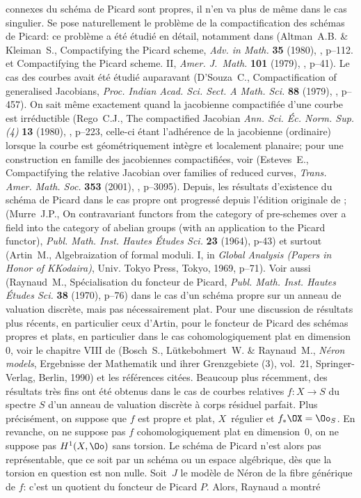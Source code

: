 \begin{remarques}
connexes du sch\'ema de Picard sont propres, il n'en va plus de m\^eme dans le cas singulier. Se pose naturellement le probl\`eme de la compactification des sch\'emas de Picard: ce probl\`eme a \'et\'e \'etudi\'e en d\'etail, notamment dans (Altman~A.B. \& Kleiman~S., {\og Compactifying the Picard scheme\fg}, \emph{Adv. in Math.} \textbf{35} (1980), , p--112. et {\og Compactifying the Picard scheme. II\fg}, \emph{Amer. J.~Math.} \textbf{101} (1979), , p--41). Le cas des courbes avait \'et\'e \'etudi\'e auparavant (D'Souza~C., {\og Compactification of generalised Jacobians\fg}, \emph{Proc. Indian Acad. Sci. Sect. A Math. Sci.} \textbf{88} (1979), , p--457). On sait m\^eme exactement quand la jacobienne compactifi\'ee d'une courbe est irr\'eductible (Rego~C.J., {\og The compactified Jacobian\fg} \emph{Ann. Sci. \'Ec. Norm. Sup. (4)} \textbf{13} (1980), , p--223, celle-ci \'etant l'adh\'erence de la jacobienne (ordinaire) lorsque la courbe est g\'eom\'etriquement int\`egre et localement planaire; pour une construction en famille des jacobiennes compactifi\'ees, voir (Esteves~E., {\og Compactifying the relative Jacobian over families of reduced curves\fg}, \emph{Trans. Amer. Math. Soc.} \textbf{353} (2001), , p--3095). Depuis, les r\'esultats d'existence du sch\'ema de Picard dans le cas propre ont progress\'e depuis l'\'edition originale de ; \cf (Murre~J.P., {\og On contravariant functors from the category of pre-schemes over a field into the category of abelian groups (with an application to the Picard functor)\fg}, \emph{Publ. Math. Inst. Hautes \'Etudes Sci.} \textbf{23} (1964), p-43) et surtout (Artin~M., {\og Algebraization of formal moduli. I\fg}, in \emph{Global Analysis (Papers in Honor of K\ptbl Kodaira)}, Univ. Tokyo Press, Tokyo, 1969, p--71). Voir aussi (Raynaud~M., {\og Sp\'ecialisation du foncteur de Picard\fg}, \emph{Publ. Math. Inst. Hautes \'Etudes Sci.} \textbf{38} (1970), p--76) dans le cas d'un sch\'ema propre sur un anneau de valuation discr\`ete, mais pas n\'ecessairement plat. Pour une discussion de r\'esultats plus r\'ecents, en particulier ceux d'Artin, pour le foncteur de Picard des sch\'emas propres et plats, en particulier dans le cas cohomologiquement plat en dimension $0$, voir le chapitre VIII de (Bosch~S., Lütkebohmert~W. \& Raynaud~M., \emph{N\'eron models}, Ergebnisse der Mathematik und ihrer Grenzgebiete (3), vol.~21, Springer-Verlag, Berlin, 1990) et les r\'ef\'erences cit\'ees. Beaucoup plus r\'ecemment, des r\'esultats tr\`es fins ont \'et\'e obtenus dans le cas de courbes relatives $f:X\to S$  du spectre $S$ d'un anneau de valuation discr\`ete \`a corps r\'esiduel parfait. Plus pr\'ecis\'ement, on suppose que $f$ est propre et plat, $X$~r\'egulier et $f_*\OX=\Oo_S$. En revanche, on ne suppose pas $f$ cohomologiquement plat en dimension~$0$, \ie on ne suppose pas $H^1(X,\Oo)$ sans torsion. Le sch\'ema de Picard n'est alors pas repr\'esentable, que ce soit par un sch\'ema ou un espace alg\'ebrique, d\`es que la torsion en question est non nulle. Soit~$J$ le mod\`ele de N\'eron de la fibre g\'en\'erique de $f$: c'est un quotient du foncteur de Picard $P$. Alors, Raynaud a montr\'e 
\end{remarques}
